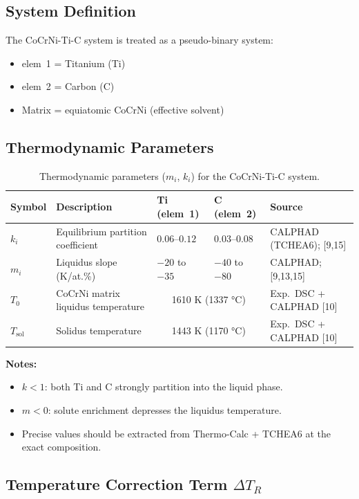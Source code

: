 \documentclass[12pt, a4paper]{article}
\begin{document}
\subsection{System Definition}

The CoCrNi-Ti-C system is treated as a pseudo-binary system:
\begin{itemize}
  \item elem~1 = Titanium (Ti)
  \item elem~2 = Carbon (C)
  \item Matrix = equiatomic CoCrNi (effective solvent)
\end{itemize}

\subsection{Thermodynamic Parameters}

\begin{table}[htbp]
\centering
\caption{Thermodynamic parameters ($m_i$, $k_i$) for the CoCrNi-Ti-C system.}
\label{tab:thermo}
\begin{tabular}{lllll}
\toprule
Symbol & Description & Ti (elem~1) & C (elem~2) & Source \\
\midrule
$k_i$  & Equilibrium partition coefficient & $0.06$--$0.12$ & $0.03$--$0.08$ & CALPHAD (TCHEA6); [9,15] \\
$m_i$  & Liquidus slope (K/at.\%)          & $-20$ to $-35$ & $-40$ to $-80$ & CALPHAD; [9,13,15] \\
$T_0$  & CoCrNi matrix liquidus temperature & \multicolumn{2}{c}{1610 K (1337 °C)} & Exp.\ DSC + CALPHAD [10] \\
$T_\text{sol}$ & Solidus temperature        & \multicolumn{2}{c}{1443 K (1170 °C)} & Exp.\ DSC + CALPHAD [10] \\
\bottomrule
\end{tabular}
\end{table}

\noindent\textbf{Notes:}
\begin{itemize}
  \item $k < 1$: both Ti and C strongly partition into the liquid phase.
  \item $m < 0$: solute enrichment depresses the liquidus temperature.
  \item Precise values should be extracted from Thermo-Calc + TCHEA6 at the exact composition.
\end{itemize}

\subsection{Temperature Correction Term $\Delta T_R$}
\end{document}
